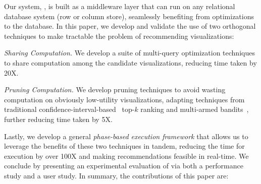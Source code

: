 
Our system, \SeeDB, is built as a middleware layer that can run on any 
relational database system (row or column store), 
seamlessly benefiting from optimizations to 
the database. 
In this paper, we develop and validate the use of  
two orthogonal techniques to make tractable the problem
of recommending visualizations:
\begin{denselist}
\item {\em Sharing Computation.} 
We develop a suite of multi-query optimization techniques to share computation
among the candidate visualizations,
reducing time taken by 20X.
\item {\em Pruning Computation.}
We develop pruning techniques to avoid wasting computation
on obviously low-utility visualizations, adapting
techniques from traditional 
  confidence-interval-based~\cite{hoeffding1963probability} 
  top-$k$ ranking and
  multi-armed bandits~\cite{bandits},
  further reducing time taken by 5X.
\end{denselist}
Lastly, we develop a general {\em phase-based execution framework}
that allows us to leverage the benefits of these two techniques
in tandem, reducing the time for execution by over 100X and
making recommendations feasible in real-time.
We conclude by presenting an experimental evaluation of \SeeDB 
via both a performance study and a user study.
In summary, the contributions of this paper are:


